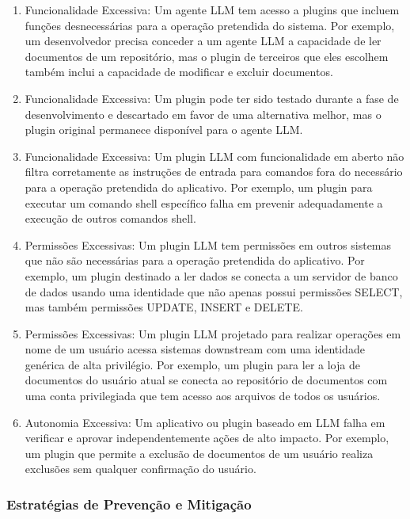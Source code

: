 \documentclass[
]{article}
\providecommand{\tightlist}{%
  \setlength{\itemsep}{0pt}\setlength{\parskip}{0pt}}
\begin{document}
\begin{enumerate}
\def\labelenumi{\arabic{enumi}.}
\tightlist
\item
  Funcionalidade Excessiva: Um agente LLM tem acesso a plugins que
  incluem funções desnecessárias para a operação pretendida do sistema.
  Por exemplo, um desenvolvedor precisa conceder a um agente LLM a
  capacidade de ler documentos de um repositório, mas o plugin de
  terceiros que eles escolhem também inclui a capacidade de modificar e
  excluir documentos.
\item
  Funcionalidade Excessiva: Um plugin pode ter sido testado durante a
  fase de desenvolvimento e descartado em favor de uma alternativa
  melhor, mas o plugin original permanece disponível para o agente LLM.
\item
  Funcionalidade Excessiva: Um plugin LLM com funcionalidade em aberto
  não filtra corretamente as instruções de entrada para comandos fora do
  necessário para a operação pretendida do aplicativo. Por exemplo, um
  plugin para executar um comando shell específico falha em prevenir
  adequadamente a execução de outros comandos shell.
\item
  Permissões Excessivas: Um plugin LLM tem permissões em outros sistemas
  que não são necessárias para a operação pretendida do aplicativo. Por
  exemplo, um plugin destinado a ler dados se conecta a um servidor de
  banco de dados usando uma identidade que não apenas possui permissões
  SELECT, mas também permissões UPDATE, INSERT e DELETE.
\item
  Permissões Excessivas: Um plugin LLM projetado para realizar operações
  em nome de um usuário acessa sistemas downstream com uma identidade
  genérica de alta privilégio. Por exemplo, um plugin para ler a loja de
  documentos do usuário atual se conecta ao repositório de documentos
  com uma conta privilegiada que tem acesso aos arquivos de todos os
  usuários.
\item
  Autonomia Excessiva: Um aplicativo ou plugin baseado em LLM falha em
  verificar e aprovar independentemente ações de alto impacto. Por
  exemplo, um plugin que permite a exclusão de documentos de um usuário
  realiza exclusões sem qualquer confirmação do usuário.
\end{enumerate}

\subsubsection{Estratégias de Prevenção e
Mitigação}\label{estratuxe9gias-de-prevenuxe7uxe3o-e-mitigauxe7uxe3o}
\end{document}
